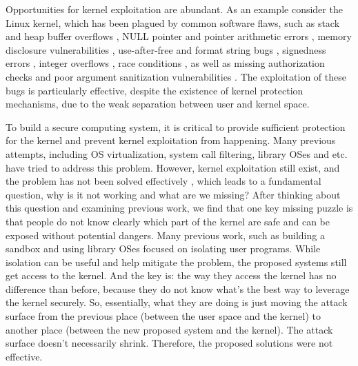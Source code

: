Opportunities for kernel exploitation are abundant. As an example consider the Linux kernel, 
which has been plagued by common software flaws, such as stack and heap buffer overflows 
\cite{CVE:20093234, CVE:20131828, CVE:20132892}, NULL pointer and pointer arithmetic errors 
\cite{CVE:20050736, CVE:20092698}, memory disclosure vulnerabilities 
\cite{CVE:20093002, CVE:20104073}, use-after-free and format string bugs 
\cite{CVE:20132852, CVE:20134343}, signedness errors \cite{CVE:20103437, CVE:20132094}, 
integer overflows \cite{CVE:20050736, CVE:20102959}, race conditions 
\cite{CVE:20091527, CVE:20093547}, as well as missing authorization checks and 
poor argument sanitization vulnerabilities 
\cite{CVE:20103904, CVE:20104347, CVE:20120946, CVE:20130268}. 
The exploitation of these bugs is particularly effective, 
despite the existence of kernel protection mechanisms, 
due to the weak separation between user and kernel space.

To build a secure computing system, it is critical to provide sufficient protection for the kernel and 
prevent kernel exploitation from happening. Many previous attempts, including OS virtualization, 
system call filtering, library OSes and etc. have tried to address this problem. However, 
kernel exploitation still exist, and the problem has not been solved 
effectively 
, which leads to a 
fundamental question, why is it not working and what are we missing? After thinking about this
question and examining previous work, we find that one key missing puzzle is that people do not know 
clearly which part of the kernel are safe and can be exposed without potential dangers. Many previous
work, such as building a sandbox and using library OSes focused on isolating user programs. While isolation 
can be useful and help mitigate the problem, the proposed systems still get access to the kernel. 
And the key is: the way they access the kernel has no difference than before, because they do not 
know what's the best way to leverage the kernel securely. So, essentially, what they are doing is just moving 
the attack surface from the previous place (between the user space and the kernel) to another place 
(between the new proposed system and the kernel). The attack surface
doesn't necessarily shrink.  
Therefore, the proposed solutions were not effective. 

